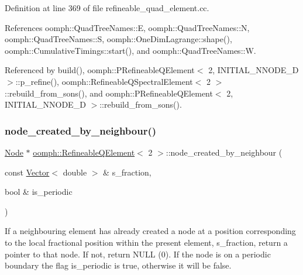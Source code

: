 Definition at line 369 of file refineable\+\_\+quad\+\_\+element.\+cc.



References oomph\+::\+Quad\+Tree\+Names\+::E, oomph\+::\+Quad\+Tree\+Names\+::N, oomph\+::\+Quad\+Tree\+Names\+::S, oomph\+::\+One\+Dim\+Lagrange\+::shape(), oomph\+::\+Cumulative\+Timings\+::start(), and oomph\+::\+Quad\+Tree\+Names\+::W.



Referenced by build(), oomph\+::\+P\+Refineable\+Q\+Element$<$ 2, I\+N\+I\+T\+I\+A\+L\+\_\+\+N\+N\+O\+D\+E\+\_\+D $>$\+::p\+\_\+refine(), oomph\+::\+Refineable\+Q\+Spectral\+Element$<$ 2 $>$\+::rebuild\+\_\+from\+\_\+sons(), and oomph\+::\+P\+Refineable\+Q\+Element$<$ 2, I\+N\+I\+T\+I\+A\+L\+\_\+\+N\+N\+O\+D\+E\+\_\+D $>$\+::rebuild\+\_\+from\+\_\+sons().

\mbox{\label{classoomph_1_1RefineableQElement_3_012_01_4_acf706049e7394cafa3d5f979222b907e}} 
\subsubsection{\texorpdfstring{node\+\_\+created\+\_\+by\+\_\+neighbour()}{node\_created\_by\_neighbour()}}
{\footnotesize\ttfamily \hyperlink{classoomph_1_1Node}{Node} $\ast$ \hyperlink{classoomph_1_1RefineableQElement}{oomph\+::\+Refineable\+Q\+Element}$<$ 2 $>$\+::node\+\_\+created\+\_\+by\+\_\+neighbour (\begin{DoxyParamCaption}\item[{const \hyperlink{classoomph_1_1Vector}{Vector}$<$ double $>$ \&}]{s\+\_\+fraction,  }\item[{bool \&}]{is\+\_\+periodic }\end{DoxyParamCaption})\hspace{0.3cm}{\ttfamily [virtual]}}



If a neighbouring element has already created a node at a position corresponding to the local fractional position within the present element, s\+\_\+fraction, return a pointer to that node. If not, return N\+U\+LL (0). If the node is on a periodic boundary the flag is\+\_\+periodic is true, otherwise it will be false. 

